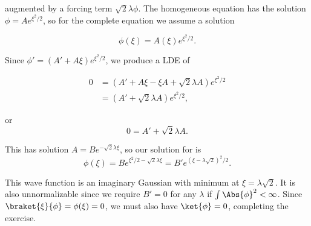 {augmented by a forcing term \(\sqrt{2}\lambda \phi\).  The homogeneous equation has the solution \(\phi = A e^{\xi^2/2}\), so for the complete equation we assume a solution

\begin{equation}\label{eqn:qmIexamPractice2008Dec:1e:50}
\phi(\xi) = A(\xi) e^{\xi^2/2}.
\end{equation}

Since \(\phi' = (A' + A \xi) e^{\xi^2/2}\), we produce a LDE of

\begin{equation}\label{eqn:qmIexamPractice:670}
\begin{aligned}
0 &= (A' + A \xi -\xi A + \sqrt{2} \lambda A ) e^{\xi^2/2} \\
&= (A' + \sqrt{2} \lambda A ) e^{\xi^2/2},
\end{aligned}
\end{equation}

or
\begin{equation}\label{eqn:qmIexamPractice2008Dec:1e:60}
0 = A' + \sqrt{2} \lambda A.
\end{equation}

This has solution \(A = B e^{-\sqrt{2} \lambda \xi}\), so our solution for  is
\begin{equation}\label{eqn:qmIexamPractice2008Dec:1e:70}
\phi(\xi) = B e^{\xi^2/2 - \sqrt{2} \lambda \xi}
= B' e^{ (\xi - \lambda \sqrt{2} )^2/2}.
\end{equation}

This wave function is an imaginary Gaussian with minimum at \(\xi = \lambda\sqrt{2}\).  It is also unnormalizable since we require \(B' = 0\) for any \(\lambda\) if \(\int \Abs{\phi}^2 < \infty\).  Since \(\braket{\xi}{\phi} = \phi(\xi) = 0\), we must also have \(\ket{\phi} = 0\), completing the exercise.

} %
